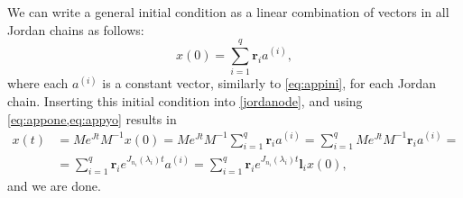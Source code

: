 \documentclass[../main.tex]{subfiles}
\begin{document}
We can write a general initial condition as a linear combination of vectors in all Jordan chains as follows:
\begin{equation}
    x(0) = \sum_{i=1}^q \boldsymbol{r}_ia^{(i)},
\end{equation}
where each $a^{(i)}$ is a constant vector, similarly to \cref{eq:appini}, for each Jordan chain. Inserting this initial condition into \cref{jordanode}, and using \cref{eq:appone,eq:appyo} results in
\begin{equation}
    \begin{aligned}
        x(t) &= Me^{Jt}M^{-1}x(0) = Me^{Jt}M^{-1}\sum_{i=1}^q \boldsymbol{r}_ia^{(i)} = \sum_{i=1}^qMe^{Jt}M^{-1} \boldsymbol{r}_ia^{(i)} =\\&= \sum_{i=1}^q\boldsymbol{r}_ie^{J_{n_i}(\lambda_i)t}a^{(i)} = \sum_{i=1}^q\boldsymbol{r}_ie^{J_{n_i}(\lambda_i)t}\boldsymbol{l}_ix(0),
\end{aligned}
\end{equation}
and we are done.
\end{document}
